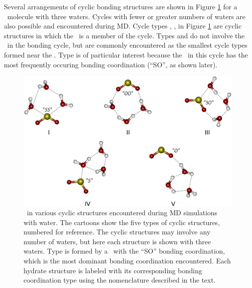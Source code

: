 Several arrangements of cyclic bonding structures are shown in Figure \ref{fig:cyclic-structures} for a \suldiox~molecule with three waters. Cycles with fewer or greater numbers of waters are also possible and encountered during MD. Cycle types , ,  in Figure \ref{fig:cyclic-structures} are cyclic structures in which the \suldiox~is a member of the cycle. Types  and  do not involve the \suldiox~in the bonding cycle, but are commonly encountered as the smallest cycle types formed near the \suldiox. Type  is of particular interest because the \suldiox~in this cycle has the most frequently occuring bonding coordination (``SO'', as shown later).

\begin{figure}[h!]
	\begin{center}
		\includegraphics[scale=1.0]{images/cycles/cycle-types-small.png}
		\caption{\suldiox~in various cyclic structures encountered during MD simulations with water. The cartoons show the five types of cyclic structures, numbered for reference. The cyclic structures may involve any number of waters, but here each structure is shown with three waters. Type  is formed by a \suldiox~with the ``SO'' bonding coordination, which is the most dominant bonding coordination encountered. Each hydrate structure is labeled with its corresponding bonding coordination type using the nomenclature described in the text.}
		\label{fig:cyclic-structures}
	\end{center}
\end{figure}

